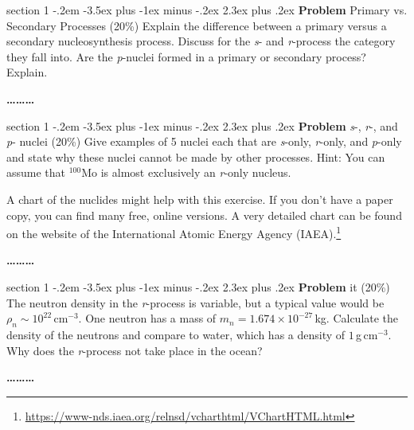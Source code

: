 \documentclass[letterpaper,12pt,twoside=false,DIV=11]{scrartcl}
\makeatletter
\newenvironment{problem}{\@startsection
    {section}
    {1}
    {-.2em}
    {-3.5ex plus -1ex minus -.2ex}
    {2.3ex plus .2ex}
    {
        \pagebreak[3] %
        \noindent\sffamily\bfseries Problem
    }
}
{
    \begin{center}\large\bfseries\ldots\ldots\ldots\end{center}
}
\providecommand{\ex}[1]{\ensuremath{^{#1}}}
\makeatother
\begin{document}
\begin{problem}{Primary vs. Secondary Processes (20\%)}
Explain the difference between a primary versus a secondary nucleosynthesis process. Discuss for the \textit{s}- and \textit{r}-process the category they fall into. Are the \textit{p}-nuclei formed in a primary or secondary process? Explain.
\end{problem}


\begin{problem}{\textit{s}-, \textit{r}-, and \textit{p}- nuclei (20\%)}
Give examples of 5 nuclei each that are \textit{s}-only, \textit{r}-only, and \textit{p}-only and state why these nuclei cannot be made by other processes. Hint: You can assume that \ex{100}Mo is almost exclusively an \textit{r}-only nucleus. 

A chart of the nuclides might help with this exercise. If you don't have a paper copy, you can find many free, online versions. A very detailed chart can be found on the website of the International Atomic Energy Agency (IAEA).\footnote{\url{https://www-nds.iaea.org/relnsd/vcharthtml/VChartHTML.html}}
\end{problem}


\begin{problem}{it (20\%)}
The neutron density in the \textit{r}-process is variable, but a typical value would be $\rho_n \sim 10^{22}\,\mathrm{cm}^{-3}$. One neutron has a mass of $m_n = 1.674\times10^{-27}$\,kg. Calculate the density of the neutrons and compare to water, which has a density of $1$\,g\,cm$^{-3}$. Why does the \textit{r}-process not take place in the ocean?
\end{problem}
\end{document}
